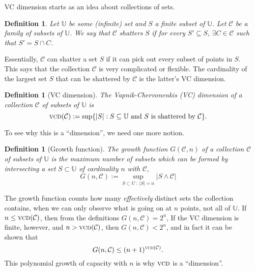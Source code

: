 \documentclass{article}
\theoremstyle{plain}
\newtheorem{definition}[theorem]{Definition}
\DeclareMathOperator*{\vcd}{\textsc{vcd}}
\begin{document}
VC dimension starts as an idea about collections of sets.
\begin{definition}
  Let $\mathbb{U}$ be some (infinite) set and $S$ a finite subset of
  $\mathbb{U}$. Let $\mathcal{C}$ be a family of subsets of $\mathbb{U}$. We
  say that $\mathcal{C}$ \emph{shatters} $S$ if for every $S' \subseteq S$,
  $\exists C \in\mathcal{C}$ such that $S' = S \cap C$.
\end{definition}
Essentially, $\mathcal{C}$ can shatter a set $S$ if it can pick out every
subset of points in $S$. This says that the collection $\mathcal{C}$ is very
complicated or flexible. The cardinality of the largest set $S$ that can be
shattered by $\mathcal{C}$ is the latter's VC dimension.
\begin{definition}
  [VC dimension]
  The \emph{Vapnik-Chervonenkis (VC) dimension} of a collection
  $\mathcal{C}$ of subsets of $\mathbb{U}$ is
  \begin{equation}
    \vcd(\mathcal{C}) := \sup \{ |S| : S\subseteq \mathbb{U}\mbox{ and
      $S$ is shattered by
    } \mathcal{C} \}.
  \end{equation}
\end{definition}
To see why this is a ``dimension'', we need one more notion.
\begin{definition}
  [Growth function] The \emph{growth function} $G(\mathcal{C},n)$ of a
  collection $\mathcal{C}$ of subsets of $\mathbb{U}$ is the maximum
  number of
  subsets which can be formed by intersecting a set $S \subset \mathbb{U}$ of
  cardinality $n$ with $\mathcal{C}$,
  \begin{equation}
    G(n,\mathcal{C}) := \sup_{S\subset U~:~ |S|=n}{|S\wedge \mathcal{C}|}
  \end{equation}
\end{definition}
The growth function counts how many {\em effectively} distinct sets the
collection contains, when we can only observe what is going on at $n$ points,
not all of $\mathbb{U}$.  If $n \leq \vcd(\mathcal{C})$, then from the definitions
$G(n,\mathcal{C}) = 2^n$, If the VC dimension is finite, however, and $n >
\vcd(\mathcal{C})$, then $G(n,\mathcal{C}) < 2^n$, and in fact it can be shown
\citep{VapnikChervonenkis1971} that
\begin{equation}
  G(n,\mathcal{C}) \leq
  (n+1)^{\vcd(\mathcal{C})}.
\end{equation}
This polynomial
growth of capacity with $n$ is why $\vcd$ is a ``dimension''.  
\end{document}
